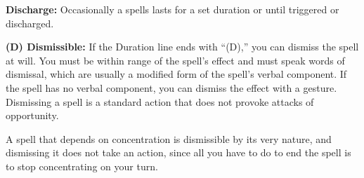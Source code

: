 \textbf{Discharge:} Occasionally a spells lasts for a set duration or until triggered or discharged.

\textbf{(D) Dismissible:} If the Duration line ends with  ``(D),'' you can dismiss the spell at will. You must be within range of the spell's effect and must speak words of dismissal, which are usually a modified form of the spell's verbal component. If the spell has no verbal component, you can dismiss the effect with a gesture. Dismissing a spell is a standard action that does not provoke attacks of opportunity.

A spell that depends on concentration is dismissible by its very nature, and dismissing it does not take an action, since all you have to do to end the spell is to stop concentrating on your turn.